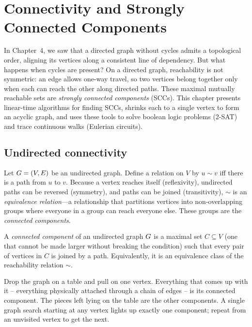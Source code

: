 \chapter{Connectivity and Strongly Connected Components}

In Chapter~4, we saw that a directed graph without cycles admits a topological order,
aligning its vertices along a consistent line of dependency. But what happens when
cycles are present? On a directed graph, reachability is not symmetric: an edge allows
one-way travel, so two vertices belong together only when each can reach the other
along directed paths. These maximal mutually reachable sets are \emph{strongly connected
components} (SCCs). This chapter
presents linear-time algorithms for finding SCCs, shrinks each to a single vertex to form an acyclic
graph, and uses these tools to solve boolean logic problems (2-SAT) and trace continuous walks (Eulerian circuits).

\chapterline

\section{Undirected connectivity}
\label{ch05:undirected}

Let $G = (V, E)$ be an undirected graph. Define a relation on $V$ by $u \sim v$ iff there is a path from $u$ to $v$. Because a vertex reaches itself (reflexivity), undirected paths can be reversed (symmetry), and paths can be joined (transitivity), $\sim$ is an \emph{equivalence relation}---a relationship that partitions vertices into non-overlapping groups where everyone in a group can reach everyone else. These groups are the \emph{connected components}.

\begin{definition}
\label{ch05:def-cc}
A \emph{connected component} of an undirected graph $G$ is a maximal set $C \subseteq V$ (one that cannot be made larger without breaking the condition) such that every pair of vertices in $C$ is joined by a path. Equivalently, it is an equivalence class of the reachability relation $\sim$.
\end{definition}

\begin{intuitionbox}
Drop the graph on a table and pull on one vertex. Everything that comes up with it -- everything physically attached through a chain of edges -- is its connected component. The pieces left lying on the table are the other components. A single graph search starting at any vertex lights up exactly one component; repeat from an unvisited vertex to get the next.
\end{intuitionbox}

